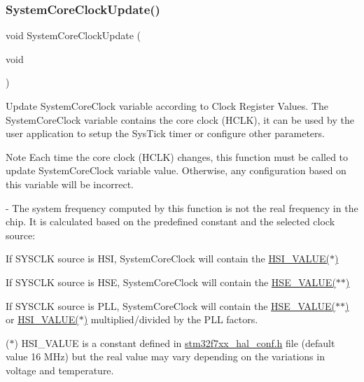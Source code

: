 \subsubsection{\texorpdfstring{SystemCoreClockUpdate()}{SystemCoreClockUpdate()}}
{\footnotesize\ttfamily void System\+Core\+Clock\+Update (\begin{DoxyParamCaption}\item[{void}]{ }\end{DoxyParamCaption})}



Update System\+Core\+Clock variable according to Clock Register Values. The System\+Core\+Clock variable contains the core clock (H\+C\+LK), it can be used by the user application to setup the Sys\+Tick timer or configure other parameters. 

\begin{DoxyNote}{Note}
Each time the core clock (H\+C\+LK) changes, this function must be called to update System\+Core\+Clock variable value. Otherwise, any configuration based on this variable will be incorrect.

-\/ The system frequency computed by this function is not the real frequency in the chip. It is calculated based on the predefined constant and the selected clock source\+:
\end{DoxyNote}

\begin{DoxyItemize}
\item If S\+Y\+S\+C\+LK source is H\+SI, System\+Core\+Clock will contain the \mbox{\hyperlink{group___s_t_m32_f7xx___system___private___includes_gaaa8c76e274d0f6dd2cefb5d0b17fbc37}{H\+S\+I\+\_\+\+V\+A\+L\+U\+E($\ast$)}}
\item If S\+Y\+S\+C\+LK source is H\+SE, System\+Core\+Clock will contain the \mbox{\hyperlink{group___s_t_m32_f7xx___system___private___includes_gaeafcff4f57440c60e64812dddd13e7cb}{H\+S\+E\+\_\+\+V\+A\+L\+U\+E($\ast$$\ast$)}}
\item If S\+Y\+S\+C\+LK source is P\+LL, System\+Core\+Clock will contain the \mbox{\hyperlink{group___s_t_m32_f7xx___system___private___includes_gaeafcff4f57440c60e64812dddd13e7cb}{H\+S\+E\+\_\+\+V\+A\+L\+U\+E($\ast$$\ast$)}} or \mbox{\hyperlink{group___s_t_m32_f7xx___system___private___includes_gaaa8c76e274d0f6dd2cefb5d0b17fbc37}{H\+S\+I\+\_\+\+V\+A\+L\+U\+E($\ast$)}} multiplied/divided by the P\+LL factors.
\end{DoxyItemize}

($\ast$) H\+S\+I\+\_\+\+V\+A\+L\+UE is a constant defined in \mbox{\hyperlink{stm32f7xx__hal__conf_8h_source}{stm32f7xx\+\_\+hal\+\_\+conf.\+h}} file (default value 16 M\+Hz) but the real value may vary depending on the variations in voltage and temperature.

